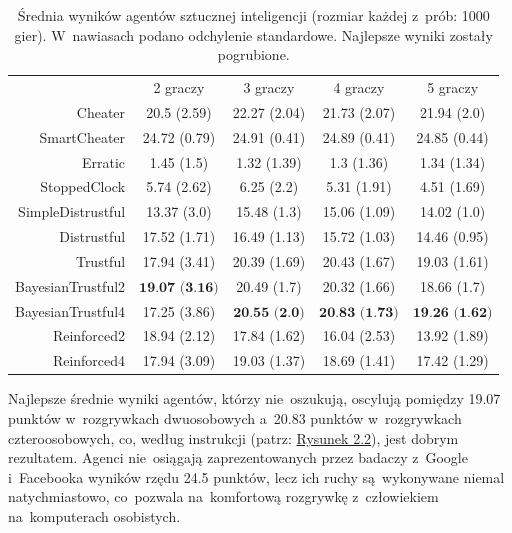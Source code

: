 \documentclass[declaration,shortabstract,inz]{iithesis}
\begin{document}
\begin{table}[H]
	\centering
	\captionsetup{format=hang}
	\begin{tabular}{ r|c|c|c|c| }		
 		\multicolumn{1}{r}{}		
 		 & \multicolumn{1}{c}{2 graczy}		
 		 & \multicolumn{1}{c}{3 graczy}		
 		 & \multicolumn{1}{c}{4 graczy}		
 		 & \multicolumn{1}{c}{5 graczy} \\		
 		\cline{2-5}		
 		Cheater & 20.5 (2.59) & 22.27 (2.04) & 21.73 (2.07) & 21.94 (2.0) \\		
 		\cline{2-5}		
 		SmartCheater & 24.72 (0.79) & 24.91 (0.41) & 24.89 (0.41) & 24.85 (0.44) \\		
 		\cline{2-5}		
 		Erratic & 1.45 (1.5) & 1.32 (1.39) & 1.3 (1.36) & 1.34 (1.34) \\
 		\cline{2-5}		
 		StoppedClock & 5.74 (2.62) & 6.25 (2.2) & 5.31 (1.91) & 4.51 (1.69) \\
 		\cline{2-5}		
 		SimpleDistrustful & 13.37 (3.0) & 15.48 (1.3) & 15.06 (1.09) & 14.02 (1.0) \\
 		\cline{2-5}		
 		Distrustful & 17.52 (1.71) & 16.49 (1.13) & 15.72 (1.03) & 14.46 (0.95) \\
 		\cline{2-5}		
 		Trustful & 17.94 (3.41) & 20.39 (1.69) & 20.43 (1.67) & 19.03 (1.61) \\
 		\cline{2-5}		
 		BayesianTrustful2 & $\textbf{19.07 (3.16)}$ & 20.49 (1.7) & 20.32 (1.66) & 18.66 (1.7) \\
 		\cline{2-5}		
 		BayesianTrustful4 & 17.25 (3.86) & $\textbf{20.55 (2.0)}$ & $\textbf{20.83 (1.73)}$ & $\textbf{19.26 (1.62)}$ \\
 		\cline{2-5}		
 		Reinforced2 & 18.94 (2.12) & 17.84 (1.62) & 16.04 (2.53) & 13.92 (1.89) \\
 		\cline{2-5}		
 		Reinforced4 & 17.94 (3.09) & 19.03 (1.37) & 18.69 (1.41) & 17.42 (1.29) \\
 		\cline{2-5}		
 	\end{tabular}		
 	\caption{Średnia wyników agentów sztucznej inteligencji (rozmiar każdej z~prób: 1000 gier). W~nawiasach podano odchylenie standardowe. Najlepsze wyniki zostały pogrubione.}		
 	\label{table:summary}		
 \end{table}
 
Najlepsze średnie wyniki agentów, którzy nie~oszukują, oscylują pomiędzy 19.07 punktów w~rozgrywkach dwuosobowych a~20.83 punktów w~rozgrywkach czteroosobowych, co, według instrukcji (patrz: \hyperref[fig:scores]{Rysunek 2.2}), jest dobrym rezultatem. Agenci nie~osiągają zaprezentowanych przez badaczy z~Google i~Facebooka wyników rzędu 24.5 punktów, lecz ich ruchy są~wykonywane niemal natychmiastowo, co~pozwala na~komfortową rozgrywkę z~człowiekiem na~komputerach osobistych.
 
\end{document}
